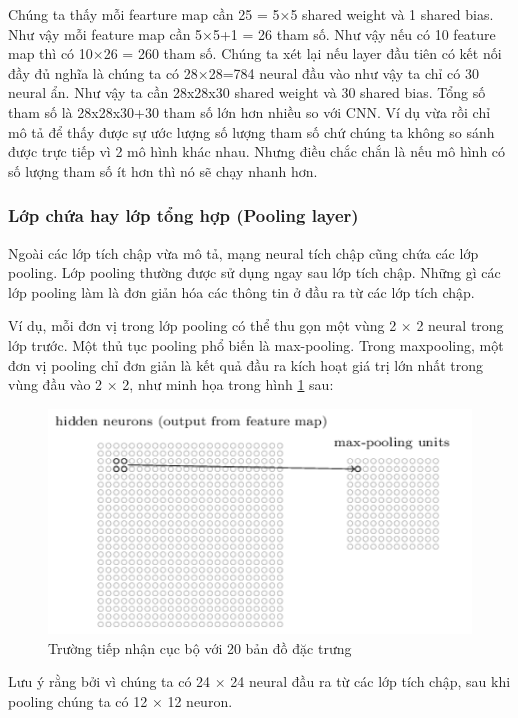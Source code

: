 Chúng ta thấy mỗi fearture map cần 25 = 5×5 shared weight và 1 shared bias. Như vậy mỗi feature map cần 5×5+1 = 26 tham số. Như vậy nếu có 10 feature map thì có 10×26 = 260 tham số. Chúng ta xét lại nếu layer đầu tiên có kết nối đầy đủ nghĩa là chúng ta có 28×28=784 neural đầu vào như vậy ta chỉ có 30 neural ẩn. Như vậy ta cần 28x28x30 shared weight và 30 shared bias. Tổng số tham số là 
28x28x30+30 tham số lớn hơn nhiều so với CNN. Ví dụ vừa rồi chỉ mô tả để thấy được sự ước lượng số lượng tham số chứ chúng ta không so sánh được trực tiếp vì 2 mô hình khác nhau. Nhưng điều chắc chắn là nếu mô hình có số lượng tham số ít hơn thì nó sẽ chạy nhanh hơn.

\subsubsection{Lớp chứa hay lớp tổng hợp (Pooling layer)}
Ngoài các lớp tích chập vừa mô tả, mạng neural tích chập cũng chứa các lớp pooling. Lớp pooling thường được sử dụng ngay sau lớp tích chập. Những gì các lớp pooling làm là đơn giản hóa các thông tin ở đầu ra từ các lớp tích chập. 

Ví dụ, mỗi đơn vị trong lớp pooling có thể thu gọn một vùng 2 × 2 neural trong lớp trước. Một thủ tục pooling phổ biến là max-pooling. Trong maxpooling, một đơn vị pooling chỉ đơn giản là kết quả đầu ra kích hoạt giá trị lớn nhất trong vùng đầu vào 2 × 2, như minh họa trong hình \ref{fig:cnnmaxpooling22} sau: 
\begin{figure}[H]
	\centering
	\includegraphics[width=0.8\linewidth]{images/cnnmaxpooling22.png}
	\caption{Trường tiếp nhận cục bộ với 20 bản đồ đặc trưng}
	\label{fig:cnnmaxpooling22}
\end{figure}
Lưu ý rằng bởi vì chúng ta có 24 × 24 neural đầu ra từ các lớp tích chập, sau khi pooling chúng ta có 12 × 12 neuron.

